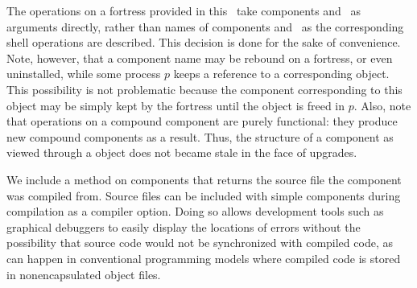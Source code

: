 The operations on a fortress provided in this \apiN\ take components and \apisN\
as arguments directly, rather than names of components and \apisN\ as the corresponding
shell operations are described. This decision is done for the sake of convenience. Note, however,
that a component name may be rebound on a fortress, or even uninstalled, while some process $p$
keeps a reference to a corresponding \TYP{Component} object. This possibility is not
problematic because the component corresponding to this object may be simply kept by the fortress
until the object is freed in $p$. Also, note that \shellcommand{upgrade} operations
on a compound component are purely
functional: they produce new compound components as a result. Thus, the structure of a component
as viewed through a \TYP{Component} object does not became stale in the face of upgrades.

We include a method
 on components that returns the source file the component was compiled from.
Source files can be included with simple components during compilation as a compiler option.
Doing so allows development tools such as graphical debuggers to easily display the 
locations of errors
without the possibility that source code would not be synchronized with compiled code, as can 
happen in conventional programming models where compiled code is stored in nonencapsulated object
files.

